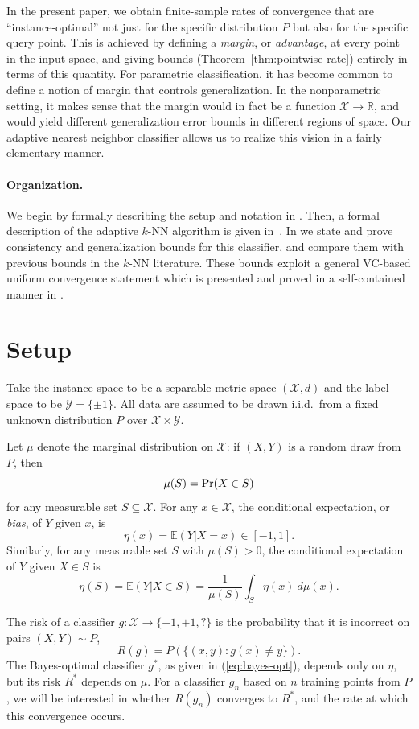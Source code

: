 \documentclass{article}
\def\R{{\mathbb{R}}}
\def\pr{{\rm Pr}}
\def\E{{\mathbb E}}
\def\X{{\mathcal X}}
\def\Y{{\mathcal Y}}
\newcommand{\new}[1]{\color{red} #1}
\begin{document}
In the present paper, we obtain finite-sample rates of convergence that are ``instance-optimal'' not just for the specific distribution $P$ but also for the specific query point. This is achieved by defining a {\it margin}, or {\it advantage}, at every point in the input space, and giving bounds (Theorem~\ref{thm:pointwise-rate}) entirely in terms of this quantity. For parametric classification, it has become common to define a notion of margin that controls generalization. In the nonparametric setting, it makes sense that the margin would in fact be a function $\X \rightarrow \R$, and would yield different generalization error bounds in different regions of space. Our adaptive nearest neighbor classifier allows us to realize this vision in a fairly elementary manner.

\paragraph{Organization.} 
{\new{We begin by formally describing the setup and notation in \Cref{sec:setup}.
Then, a formal description of the adaptive $k$-NN algorithm is given in~\Cref{sec:alg}.
In \Cref{sec:gen1,sec:gen2,sec:gen3} we state and prove consistency and generalization
bounds for this classifier, and compare them with previous bounds in the $k$-NN literature.
These bounds exploit a general VC-based uniform convergence statement
which is presented and proved in a self-contained manner in \Cref{sec:ucecm}.}}


\section{Setup}\label{sec:setup}

Take the instance space to be a separable metric space $(\X, d)$ and the label space to be $\Y = \{\pm 1\}$. All data are assumed to be drawn i.i.d.\ from a fixed unknown distribution $P$ over $\X \times \Y$.

Let $\mu$ denote the marginal distribution on $\X$: if $(X,Y)$ is a 
random draw from $P$, then
$$ \mu(S) = \pr(X \in S)$$
for any measurable set $S \subseteq \X$. For any $x \in \X$, the conditional expectation, or {\em bias}, of $Y$ given $x$, is
$$ \eta(x) = \E(Y| X = x) \in [-1,1] .$$ 
Similarly, for any measurable set $S$ with $\mu(S) > 0$, the
conditional expectation of $Y$ given $X \in S$ is
$$ \eta(S) = \E(Y| X \in S) = \frac{1}{\mu(S)} \int_S \eta(x) \ d \mu(x) .$$

The risk of a classifier $g: \X \rightarrow \{-1,+1,?\}$ is the probability that it is incorrect on pairs $(X,Y) \sim P$,
\begin{equation}
R(g) = P(\{(x,y): g(x) \neq y\}).
\label{eq:risk}
\end{equation}
The Bayes-optimal classifier $g^*$, as given in (\ref{eq:bayes-opt}), depends only on $\eta$, but its risk $R^*$ depends on $\mu$. For a classifier $g_n$ based on $n$ training points from $P$, we will be interested in whether $R(g_n)$ converges to $R^*$, and the rate at which this convergence occurs.
\end{document}
